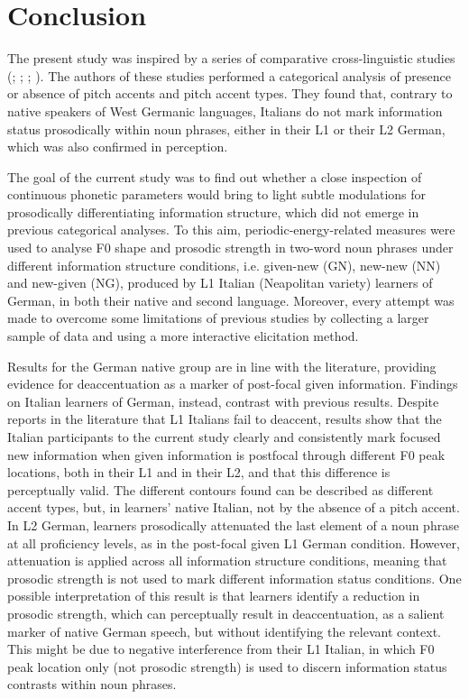 \section{Conclusion}
\label{sec:2.9}
The present study was inspired by a series of comparative cross-linguistic studies (\citealt{AvesaniEtAl2013}; \citealt{AvesaniEtAl2015}; \citealt{KrahmerSwerts2008};
\citealt{SwertsEtAl2002}). The authors of these studies performed a categorical analysis of presence or absence of pitch accents and pitch accent types. They found that, contrary to native speakers of West Germanic languages, Italians do not mark information status prosodically within noun phrases, either in their L1 or their L2 German, which was also confirmed in perception.

The goal of the current study was to find out whether a close inspection of continuous phonetic parameters would bring to light subtle modulations for prosodically differentiating information structure, which did not emerge in previous categorical analyses. To this aim, periodic-energy-related measures were used to analyse F0 shape and prosodic strength in two-word noun phrases under different information structure conditions, i.e. given-new (GN), new-new (NN) and new-given (NG), produced by L1 Italian (Neapolitan variety) learners of German, in both their native and second language. Moreover, every attempt was made to overcome some limitations of previous studies by collecting a larger sample of data and using a more interactive elicitation method.

Results for the German native group are in line with the literature, providing evidence for deaccentuation as a marker of post-focal given information. Findings on Italian learners of German, instead, contrast with previous results. Despite reports in the literature that L1 Italians fail to deaccent, results show that the Italian participants to the current study clearly and consistently mark focused new information when given information is postfocal through different F0 peak locations, both in their L1 and in their L2, and that this difference is perceptually valid. The different contours found can be described as different accent types, but, in learners’ native Italian, not by the absence of a pitch accent. In L2 German, learners prosodically attenuated the last element of a noun phrase at all proficiency levels, as in the post-focal given L1 German condition. However, attenuation is applied across all information structure conditions, meaning that prosodic strength is not used to mark different information status conditions. One possible interpretation of this result is that learners identify a reduction in prosodic strength, which can perceptually result in deaccentuation, as a salient marker of native German speech, but without identifying the relevant context. This might be due to negative interference from their L1 Italian, in which F0 peak location only (not prosodic strength) is used to discern information status contrasts within noun phrases.

